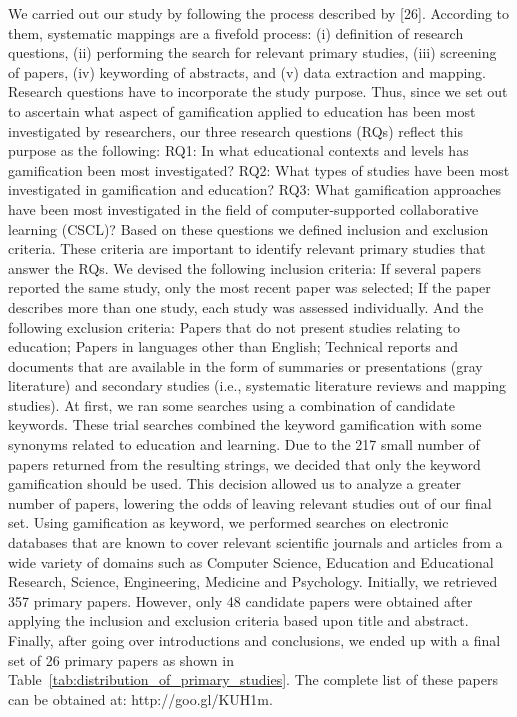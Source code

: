 We carried out our study by following the process described by
[26]. According to them, systematic mappings are a fivefold
process: (i) definition of research questions, (ii) performing the
search for relevant primary studies, (iii) screening of papers, (iv)
keywording of abstracts, and (v) data extraction and mapping.
Research questions have to incorporate the study purpose. Thus,
since we set out to ascertain what aspect of gamification applied to
education has been most investigated by researchers, our three
research questions (RQs) reflect this purpose as the following:
RQ1: In what educational contexts and levels has gamification been
most investigated?
RQ2: What types of studies have been most investigated in
gamification and education?
RQ3: What gamification approaches have been most investigated
in the field of computer-supported collaborative learning (CSCL)?
Based on these questions we defined inclusion and exclusion
criteria. These criteria are important to identify relevant primary
studies that answer the RQs. We devised the following inclusion
criteria:
 If several papers reported the same study, only the most recent
paper was selected;
 If the paper describes more than one study, each study was
assessed individually.
And the following exclusion criteria:
 Papers that do not present studies relating to education;
 Papers in languages other than English;
 Technical reports and documents that are available in the form of
summaries or presentations (gray literature) and secondary
studies (i.e., systematic literature reviews and mapping studies).
At first, we ran some searches using a combination of candidate
keywords. These trial searches combined the keyword gamification
with some synonyms related to education and learning. Due to the
217
small number of papers returned from the resulting strings, we
decided that only the keyword gamification should be used.
This decision allowed us to analyze a greater number of papers,
lowering the odds of leaving relevant studies out of our final set.
Using gamification as keyword, we performed searches on
electronic databases that are known to cover relevant scientific
journals and articles from a wide variety of domains such as
Computer Science, Education and Educational Research, Science,
Engineering, Medicine and Psychology. Initially, we retrieved 357
primary papers. However, only 48 candidate papers were obtained
after applying the inclusion and exclusion criteria based upon title
and abstract. Finally, after going over introductions and
conclusions, we ended up with a final set of 26 primary papers as
shown in Table~\ref{tab:distribution_of_primary_studies}. The complete list of these papers can be obtained
at: http://goo.gl/KUH1m. 


